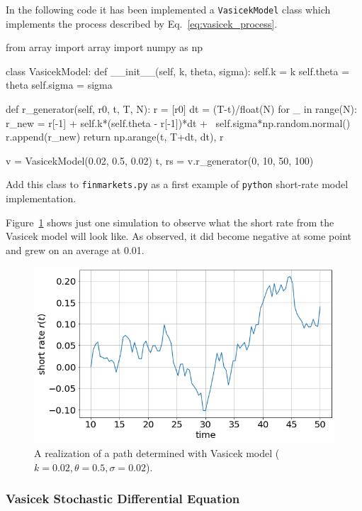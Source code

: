 In the following code it has been implemented a \texttt{VasicekModel} class which implements the process described by Eq.~\ref{eq:vasicek_process}.

\begin{ipython}
from array import array
import numpy as np

class VasicekModel:
    def __init__(self, k, theta, sigma):
        self.k = k
        self.theta = theta
        self.sigma = sigma

    def r_generator(self, r0, t, T, N):
        r = [r0]
        dt = (T-t)/float(N)
        for _ in range(N):
            r_new = r[-1] + self.k*(self.theta - r[-1])*dt + \
                    self.sigma*np.random.normal()
            r.append(r_new)
        return np.arange(t, T+dt, dt), r

v = VasicekModel(0.02, 0.5, 0.02)
t, rs = v.r_generator(0, 10, 50, 100)
\end{ipython}

\begin{finmarkets}
Add this class to \texttt{finmarkets.py} as a first example of \texttt{python} short-rate model implementation.
\end{finmarkets}

Figure~\ref{fig:vasicek_path} shows just one simulation to observe what the short rate from the Vasicek model will look like. As observed, it did become negative at some point and grew on an average at 0.01.

\begin{figure}[htb]
	\centering
	\includegraphics[width=0.7\linewidth]{figures/vasicek_short_rate}
	\caption{A realization of a path determined with Vasicek model ($k=0.02, \theta=0.5, \sigma=0.02$).}
	\label{fig:vasicek_path}
\end{figure}

\subsubsection{Vasicek Stochastic Differential Equation}
\label{vasicek-stochastic-differential-equation}

